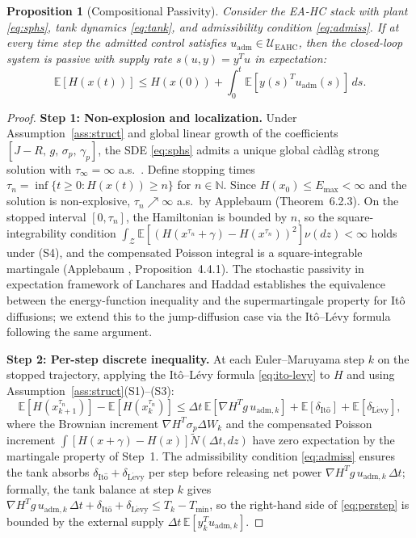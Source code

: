 \documentclass[11pt]{article}
\newtheorem{proposition}{Proposition}
\begin{document}
\begin{proposition}[Compositional Passivity]
\label{prop:passivity}
Consider the EA-HC stack with plant \eqref{eq:sphs}, tank dynamics \eqref{eq:tank}, and
admissibility condition \eqref{eq:admiss}. If at every time step the admitted control satisfies
$u_{\mathrm{adm}}\in\mathcal{U}_{\mathrm{EAHC}}$, then the closed-loop system is passive with
supply rate $s(u,y)=y^Tu$ in expectation:
\begin{equation}
\mathbb{E}[H(x(t))] \le H(x(0)) + \int_0^t \mathbb{E}[y(s)^T u_{\mathrm{adm}}(s)]\,ds.
\label{eq:passivity}
\end{equation}
\end{proposition}

\begin{proof}
\textbf{Step 1: Non-explosion and localization.} Under Assumption~\ref{ass:struct} and global
linear growth of the coefficients $[J-R,\,g,\,\sigma_p,\,\gamma_p]$, the SDE \eqref{eq:sphs}
admits a unique global c\`{a}dl\`{a}g strong solution with $\tau_\infty=\infty$ a.s.\
\cite{applebaum2009,khasminskii2012}. Define stopping times
$\tau_n=\inf\{t\ge 0:H(x(t))\ge n\}$ for $n\in\mathbb{N}$. Since $H(x_0)\le E_{\max}<\infty$
and the solution is non-explosive, $\tau_n\nearrow\infty$ a.s.\ by Applebaum
\cite{applebaum2009} (Theorem~6.2.3). On the stopped interval $[0,\tau_n]$, the Hamiltonian
is bounded by $n$, so the square-integrability condition
$\int_{\mathcal{Z}}\mathbb{E}[(H(x^{\tau_n}+\gamma)-H(x^{\tau_n}))^2]\nu(dz)<\infty$
holds under (S4), and the compensated Poisson integral is a square-integrable martingale
(Applebaum \cite{applebaum2009}, Proposition~4.4.1). The stochastic passivity in expectation
framework of Lanchares and Haddad \cite{lanchares2023} establishes the equivalence between
the energy-function inequality and the supermartingale property for It\^{o} diffusions; we
extend this to the jump-diffusion case via the It\^{o}--L\'{e}vy formula following the same
argument.

\textbf{Step 2: Per-step discrete inequality.} At each Euler--Maruyama step $k$ on the stopped
trajectory, applying the It\^{o}--L\'{e}vy formula \eqref{eq:ito-levy} to $H$ and using
Assumption~\ref{ass:struct}(S1)--(S3):
\begin{equation}
\mathbb{E}[H(x_{k+1}^{\tau_n})]-\mathbb{E}[H(x_k^{\tau_n})]
\le \Delta t\,\mathbb{E}[\nabla H^T g\,u_{\mathrm{adm},k}]
+ \mathbb{E}[\delta_{\mathrm{It\hat{o}}}]
+ \mathbb{E}[\delta_{\mathrm{L\acute{e}vy}}],
\label{eq:perstep}
\end{equation}
where the Brownian increment $\nabla H^T\sigma_p\Delta W_k$ and the compensated Poisson
increment $\int[H(x+\gamma)-H(x)]\tilde{N}(\Delta t,dz)$ have zero expectation by the
martingale property of Step~1. The admissibility condition \eqref{eq:admiss} ensures the tank
absorbs $\delta_{\mathrm{It\hat{o}}}+\delta_{\mathrm{L\acute{e}vy}}$ per step before releasing net
power $\nabla H^T g\,u_{\mathrm{adm},k}\,\Delta t$; formally, the tank balance at step $k$ gives
$\nabla H^T g\,u_{\mathrm{adm},k}\,\Delta t+\delta_{\mathrm{It\hat{o}}}+\delta_{\mathrm{L\acute{e}vy}}
\le T_k-T_{\min}$, so the right-hand side of \eqref{eq:perstep} is bounded by the external
supply $\Delta t\,\mathbb{E}[y_k^T u_{\mathrm{adm},k}]$.


\end{proof}
\end{document}
